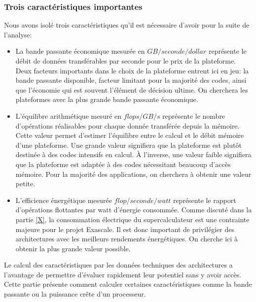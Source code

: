     
    \subsubsection{Trois caractéristiques importantes}

        Nous avons isolé trois caractéristiques qu'il est nécessaire d'avoir pour la suite de l'analyse:
        \begin{itemize}
            \item La bande passante économique mesurée en $GB/seconde/dollar$ représente le débit de données transférables par seconde pour le prix de la plateforme. Deux facteurs importants dans le choix de la plateforme entrent ici en jeu: la bande passante disponible, facteur limitant pour la majorité des codes, ainsi que l'économie qui est souvent l'élément de décision ultime. On cherchera les plateformes avec la plus grande bande passante économique.
            \item L'équilibre arithmétique mesuré en $flops/GB/s$ représente le nombre d'opérations réalisables pour chaque donnée transférée  depuis la mémoire. Cette valeur permet d'estimer l'équilibre entre le calcul et le débit mémoire d'une plateforme. Une grande valeur signifiera que la plateforme est plutôt destinée à des codes intensifs en calcul. À l'inverse, une valeur faible signifiera que la plateforme est adaptée à des codes nécessitant beaucoup d'accès mémoire. Pour la majorité des applications, on cherchera à obtenir une valeur petite.
            \item L'efficience énergétique mesurée $flop/seconde/watt$ représente le rapport d'opérations flottantes par watt d'énergie consommée. Comme discuté dans la partie \ref{X}, la consommation électrique du supercalculateur est une contrainte majeure pour le projet Exascale. Il est donc important de privilégier des architectures avec les meilleurs rendements énergétiques. On cherche ici à obtenir la plus grande valeur possible.
        \end{itemize}
            
    Le calcul des caractéristiques par les données techniques des architectures a l'avantage de permettre d'évaluer rapidement leur potentiel sans y avoir accès. Cette partie présente comment calculer certaines caractéristiques comme la bande passante ou la puissance crête d'un processeur.
    
